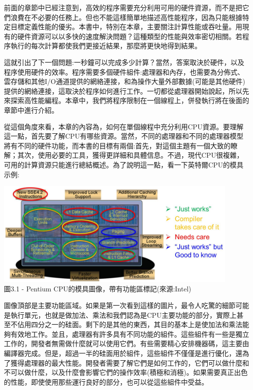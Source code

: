 前面的章節中已經注意到，高效的程序需要充分利用可用的硬件資源，而不是把它們浪費在不必要的任務上。但也不能這樣簡單地描述高性能程序，因為只能根據特定目標定義性能的優劣。本書中，特別在本章，主要關注計算性能或吞吐量。用現有的硬件資源可以以多快的速度解決問題？這種類型的性能與效率密切相關。若程序執行的每次計算都使我們更接近結果，那麼將更快地得到結果。

這就引出了下一個問題:一秒鐘可以完成多少計算？當然，答案取決於硬件，以及程序使用硬件的效率。程序需要多個硬件組件:處理器和內存，也需要為分佈式、雲存儲和其他I/O通道提供的網絡連接，和為操作大量外部數據(可能是其他硬件)提供的網絡連接，這取決於程序如何進行工作。一切都從處理器開始說起，所以先來探索高性能編程。本章中，我們將程序限制在一個線程上，併發執行將在後面的章節中進行介紹。

從這個角度來看，本章的內容為，如何在單個線程中充分利用CPU資源。要理解這一點，首先要了解CPU有哪些資源。當然，不同的處理器和不同的處理器模型將有不同的硬件功能，而本書的目標有兩個:首先，對這個主題有一個大致的瞭解；其次，使用必要的工具，獲得更詳細和具體信息。不過，現代CPU很複雜，可用的計算資源只能進行總結概述。為了說明這一點，看一下英特爾CPU的模具示例:

\begin{center}
\includegraphics[width=0.9\textwidth]{content/1/chapter3/images/1.jpg}\\
圖3.1 - Pentium CPU的模具圖像，帶有功能區標記(來源:Intel)
\end{center}

圖像頂部是主要功能區域。如果是第一次看到這樣的圖片，最令人吃驚的細節可能是執行單元，也就是做加法、乘法和我們認為是CPU主要功能的部分，實際上甚至不佔用四分之一的硅面。剩下的是其他的東西，其目的基本上是使加法和乘法能夠有效地工作。並且，處理器有許多具有不同功能的組件。這些組件有一些是獨立工作的，開發者無需做什麼就可以使用它們。有些需要精心安排機器碼，這主要由編譯器完成。但是，超過一半的硅面用於組件，這些組件不僅僅是進行優化，還為了獲得處理器的最大性能。開發者需要了解它們是如何工作的，它們可以做什麼和不可以做什麼，以及什麼會影響它們的操作效率(積極和消極)。如果需要真正出色的性能，即使使用那些運行良好的部分，也可以從這些組件中受益。

